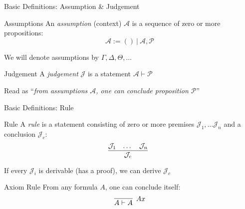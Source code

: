 \documentclass{beamer}
\begin{document}
\begin{frame}{Basic Definitions: Assumption \& Judgement}
	\begin{block}{Assumptions}
		An \textit{assumption} (context) $\mathcal{A}$ is a sequence of zero or more propositions:
		\[
			\mathcal{A} := \left( \right) \ | \ \mathcal{A}, \mathcal{P}
		\]
	\end{block}
	
	\begin{flushright}
		\small
		We will denote assumptions by $\Gamma, \Delta, \Theta, \dots$
	\end{flushright}
	
	\begin{block}{Judgement}
		A \textit{judgement} $\mathcal{J}$ is a statement $\mathcal{A} \vdash \mathcal{P}$
	\end{block}
	
	\begin{flushright}
		\small 
		Read as ``\textit{from assumptions $\mathcal{A}$, one can conclude proposition $\mathcal{P}$}''
	\end{flushright}
\end{frame}

\begin{frame}{Basic Definitions: Rule}	
	\begin{block}{Rule}
	A \textit{rule} is a statement consisting of zero or more \alert{premises} $\mathcal{J}_1, \dots \mathcal{J}_n$ and a \alert{conclusion} $\mathcal{J}_c$:
	\[
		\infer[]{\mathcal{J}_c}{
		\mathcal{J}_1 
		&
		\dots 
		&
		\mathcal{J}_n
		}
	\]
	\end{block}
	
	\begin{flushright}
		\small
		If every $\mathcal{J}_i$ is derivable (has a proof), we can derive $\mathcal{J}_c$
	\end{flushright}

	\begin{block}{Axiom Rule}
	From any formula $A$, one can conclude itself:
	\[
		\infer[Ax]{A \vdash A}{}
	\]
	
	\end{block}

\end{frame}
\end{document}

